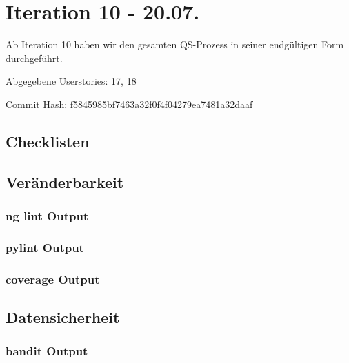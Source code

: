 
\section{Iteration 10 - 20.07.}
	Ab Iteration 10 haben wir den gesamten QS-Prozess in seiner endgültigen Form durchgeführt.

	Abgegebene Userstories: 17, 18

	Commit Hash: f5845985bf7463a32f0f4f04279ea7481a32daaf
	
	\subsection*{Checklisten}
	
	
	
	\subsection*{Veränderbarkeit}
	\subsubsection*{ng lint Output}
	
	
	\subsubsection*{pylint Output}
	

	\subsubsection*{coverage Output}
	

	\subsection*{Datensicherheit}
	\subsubsection*{bandit Output}
	


	
